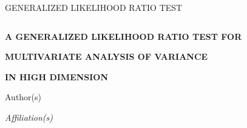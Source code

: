 \documentclass[12pt]{article} %
\theoremstyle{definition}
\begin{document}

\renewcommand{\baselinestretch}{2}


{\hfill {\footnotesize\rm GENERALIZED LIKELIHOOD RATIO TEST} \hfill}

\renewcommand{\thefootnote}{}
$\ $\par


\fontsize{12}{14pt plus.8pt minus .6pt}\selectfont \vspace{0.8pc}
\centerline{\large\bf A GENERALIZED LIKELIHOOD RATIO TEST FOR }
\vspace{2pt} \centerline{\large\bf MULTIVARIATE ANALYSIS OF VARIANCE}
\vspace{2pt} \centerline{\large\bf IN HIGH DIMENSION}
\vspace{.4cm} \centerline{Author(s)} \vspace{.4cm} \centerline{\it
Affiliation(s)} \vspace{.55cm} \fontsize{9}{11.5pt plus.8pt minus
.6pt}\selectfont

\end{document}
